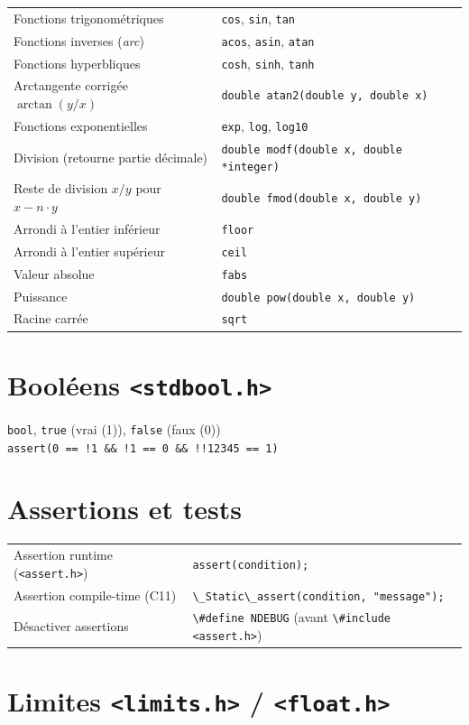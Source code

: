 \documentclass{article}
\newcommand{\cd}{\lstinline}
\begin{document}
\begin{multicols*}{3}
\begin{tabularx}{\linewidth}{Xl}
  Fonctions trigonométriques & \cd{cos}, \cd{sin}, \cd{tan} \\
  Fonctions inverses (\emph{arc}) & \cd{acos}, \cd{asin}, \cd{atan} \\
  Fonctions hyperbliques & \cd{cosh}, \cd{sinh}, \cd{tanh} \\
  Arctangente corrigée $\arctan(y / x)$ & \cd{double atan2(double y, double x)} \\
  Fonctions exponentielles & \cd{exp}, \cd{log}, \cd{log10} \\
  Division (retourne partie décimale) & \cd{double modf(double x, double *integer)} \\
  Reste de division $x/y$ pour $x - n \cdot y$ & \cd{double fmod(double x, double y)} \\
  Arrondi à l'entier inférieur & \cd{floor} \\
  Arrondi à l'entier supérieur & \cd{ceil} \\
  Valeur absolue & \cd{fabs} \\
  Puissance & \cd{double pow(double x, double y)} \\
  Racine carrée & \cd{sqrt} \\
\end{tabularx}

\section*{Booléens \texttt{<stdbool.h>}}

\cd{bool}, \cd{true} (vrai (1)), \cd{false} (faux (0)) \\
\cd{assert(0 == !1 && !1 == 0 && !!12345 == 1)}

\section*{Assertions et tests}
\begin{tabularx}{\linewidth}{Xl}
  Assertion runtime (\texttt{<assert.h>}) & \cd{assert(condition);} \\
  Assertion compile-time (C11) & \cd{\_Static\_assert(condition, "message");} \\
  Désactiver assertions & \cd{\#define NDEBUG} (avant \cd{\#include <assert.h>}) \\
\end{tabularx}

\section*{Limites \texttt{<limits.h>} / \texttt{<float.h>}}


\end{multicols*}
\end{document}
